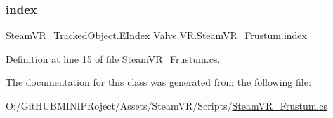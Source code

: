 \subsubsection{\texorpdfstring{index}{index}}
{\footnotesize\ttfamily \mbox{\hyperlink{class_valve_1_1_v_r_1_1_steam_v_r___tracked_object_a3d437894eff0bfc81eeb21a8c478413e}{Steam\+V\+R\+\_\+\+Tracked\+Object.\+E\+Index}} Valve.\+V\+R.\+Steam\+V\+R\+\_\+\+Frustum.\+index}



Definition at line 15 of file Steam\+V\+R\+\_\+\+Frustum.\+cs.



The documentation for this class was generated from the following file\+:\begin{DoxyCompactItemize}
\item 
O\+:/\+Git\+H\+U\+B\+M\+I\+N\+I\+P\+Roject/\+Assets/\+Steam\+V\+R/\+Scripts/\mbox{\hyperlink{_steam_v_r___frustum_8cs}{Steam\+V\+R\+\_\+\+Frustum.\+cs}}\end{DoxyCompactItemize}
